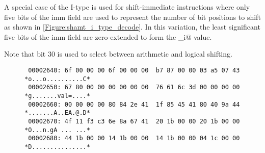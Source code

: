 \begin{figure}[ht]
\centering
\DrawInsnOpITypeDecoding
{}
\label{Figure:i_type_decode}
\label{imm.i:decode}
\end{figure}

A special case of the I-type is used for shift-immediate instructions 
where only five bits of the imm field are used to represent the number 
of bit positions to shift as shown in \autoref{Figure:shamt_i_type_decode}. 
In this variation, the least significant five bits of the imm field are 
zero-extended to form the \verb@shamt_i@ value.

\begin{figure}[ht]
\centering
\DrawInsnOpIShiftTypeDecoding
{}
\label{Figure:shamt_i_type_decode}
\label{shamt.i:decode}
\end{figure}

Note that bit 30 is used to select between arithmetic and logical shifting.

\begin{figure}[ht]
\centering
\begin{verbatim}
 00002640: 6f 00 00 00 6f 00 00 00  b7 87 00 00 03 a5 07 43 *o...o..........C*
 00002650: 67 80 00 00 00 00 00 00  76 61 6c 3d 00 00 00 00 *g.......val=....*
 00002660: 00 00 00 00 80 84 2e 41  1f 85 45 41 80 40 9a 44 *.......A..EA.@.D*
 00002670: 4f 11 f3 c3 6e 8a 67 41  20 1b 00 00 20 1b 00 00 *O...n.gA ... ...*
 00002680: 44 1b 00 00 14 1b 00 00  14 1b 00 00 04 1c 00 00 *D...............*
\end{verbatim}
\label{Figure:imm:memory:dump}
\end{figure}


